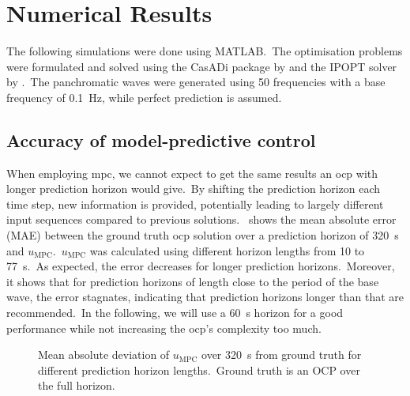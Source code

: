 \section{Numerical Results}

The following simulations were done using MATLAB.\ 
The optimisation problems were formulated and solved using the CasADi package by \cite{Andersson2019casadi} and the IPOPT solver by \cite{Waechter2006ipopt}.\
The panchromatic waves were generated using 50 frequencies with a base frequency of \SI{0.1}{\hertz}, while perfect prediction is assumed.\ 

\subsection{Accuracy of model-predictive control}
\label{sec:accuracy}
When employing \ac{mpc}, we cannot expect to get the same results an \ac{ocp} with longer prediction horizon would give.\ 
By shifting the prediction horizon each time step, new information is provided, potentially leading to largely different input sequences compared to previous solutions.\
 shows the mean absolute error (MAE) between the ground truth \ac{ocp} solution over a prediction horizon of \SI{320}{\second} and $u_\mathrm{MPC}$.\ 
$u_\mathrm{MPC}$ was calculated using different horizon lengths from 10 to \SI{77}{\second}.\
As expected, the error decreases for longer prediction horizons.\ 
Moreover, it shows that for prediction horizons of length close to the period of the base wave, the error stagnates, indicating that prediction horizons longer than that are recommended.\ 
In the following, we will use a \SI{60}{\second} horizon for a good performance while not increasing the \ac{ocp}'s complexity too much.
\begin{figure}[htb]
	\centering
	\fontsize{8}{0}\selectfont
	\def\svgwidth{0.47\textwidth}
	
	\caption{Mean absolute deviation of $u_\mathrm{MPC}$ over \SI{320}{\second} from ground truth for different prediction horizon lengths.\ Ground truth is an OCP over the full horizon.}
	\label{fig:mpc_error}
\end{figure}


